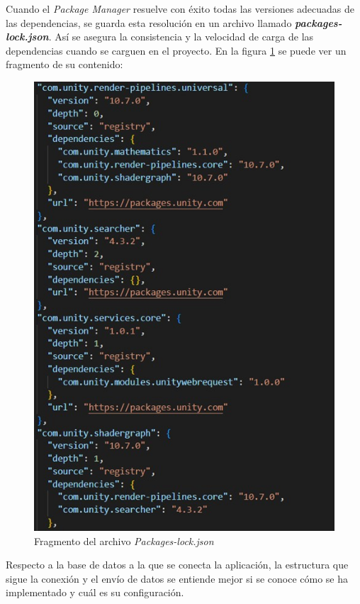 Cuando el \textit{Package Manager} resuelve con éxito todas las versiones adecuadas de las dependencias, se guarda esta resolución en un archivo llamado \textbf{\textit{packages-lock.json}}. Así se asegura la consistencia y la velocidad de carga de las dependencias cuando se carguen en el proyecto. En la figura \ref{fig:PaqueteLock} se puede ver un fragmento de su contenido:
\begin{figure}[h]
    \centering
    \includegraphics[scale=0.45]{img/Packages-lockJSON.jpg}
    \caption{Fragmento del archivo \textit{Packages-lock.json}}
    \label{fig:PaqueteLock}
    \end{figure}
Respecto a la base de datos a la que se conecta la aplicación, la estructura que sigue la conexión y el envío de datos se entiende mejor si se conoce cómo se ha implementado y cuál es su configuración.

